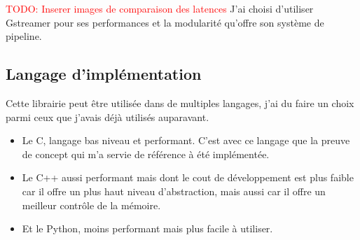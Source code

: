 \documentclass[12pt, a4paper]{report}
\makeatletter
\newcommand\TODO[1]{\textcolor{red}{TODO\@: #1}}
\makeatother
\begin{document}
\TODO{Inserer images de comparaison des latences}\newline
J'ai choisi d'utiliser Gstreamer pour ses performances et la modularité qu'offre son système de pipeline.\newline

\subsection{Langage d'implémentation}
Cette librairie peut être utilisée dans de multiples langages, j'ai du faire un choix parmi ceux que j'avais déjà utilisés auparavant.\newline
\begin{itemize}
    \item Le C, langage bas niveau et performant. C'est avec ce langage que la preuve de concept qui m'a servie de référence à été implémentée.\newline
    \item Le C++ aussi performant mais dont le cout de développement est plus faible car il offre un plus haut niveau d'abstraction, mais aussi car il offre un meilleur contrôle de la mémoire.\newline
    \item Et le Python, moins performant mais plus facile à utiliser.\newline
\end{itemize}
\end{document}
